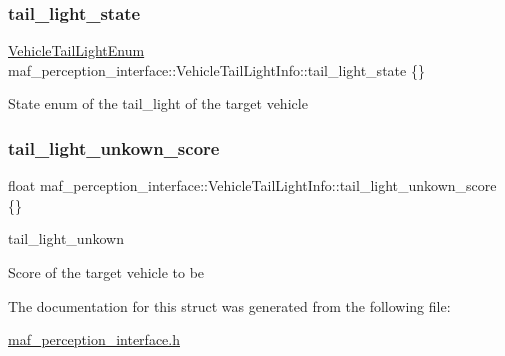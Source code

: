 \subsubsection{\texorpdfstring{tail\+\_\+light\+\_\+state}{tail\_light\_state}}
{\footnotesize\ttfamily \hyperlink{structmaf__perception__interface_1_1VehicleTailLightEnum}{Vehicle\+Tail\+Light\+Enum} maf\+\_\+perception\+\_\+interface\+::\+Vehicle\+Tail\+Light\+Info\+::tail\+\_\+light\+\_\+state \{\}}

State enum of the tail\+\_\+light of the target vehicle \mbox{\label{structmaf__perception__interface_1_1VehicleTailLightInfo_adf1cf7caab9aa2d9ceb6c0f2cf45b73f}} 
\subsubsection{\texorpdfstring{tail\+\_\+light\+\_\+unkown\+\_\+score}{tail\_light\_unkown\_score}}
{\footnotesize\ttfamily float maf\+\_\+perception\+\_\+interface\+::\+Vehicle\+Tail\+Light\+Info\+::tail\+\_\+light\+\_\+unkown\+\_\+score \{\}}



tail\+\_\+light\+\_\+unkown 

Score of the target vehicle to be 

The documentation for this struct was generated from the following file\+:\begin{DoxyCompactItemize}
\item 
\hyperlink{maf__perception__interface_8h}{maf\+\_\+perception\+\_\+interface.\+h}\end{DoxyCompactItemize}
